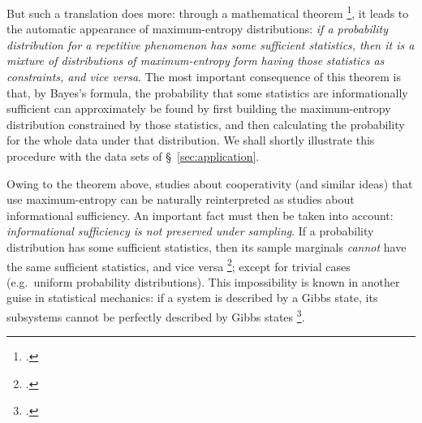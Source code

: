 \documentclass[\ifafour a4paper,12pt,\else a5paper,10pt,\fi%
onecolumn,oneside,article,%
british%
]{memoir}
\theoremstyle{remark}
\theoremstyle{innote}
\newcommand*{\citep}{\footcites}
\renewcommand*{\|}{\nonscript\,\vert\nonscript\;\mathopen{}}
\newcommand*{\sect}{\S}%
\newcommand*{\eg}{{e.g.}}
\begin{document}
But such a translation does more: through a mathematical theorem \citep[and
references therein]{andersen1970}[this theorem was first proved for
continuous probability distributions
by][]{koopman1936,pitman1936,darmois1935}[see][\sect~4.5.3 for further
references]{bernardoetal1994}, it leads to the automatic appearance of
maximum-entropy distributions: \emph{if a probability distribution for a
  repetitive phenomenon has some sufficient statistics, then it is a
  mixture of distributions of maximum-entropy form having those statistics
  as constraints, and vice versa}. 
The most important consequence of this theorem is that, by Bayes's formula,
the probability that some statistics are informationally sufficient can
approximately be found by first building the maximum-entropy distribution
constrained by those statistics, and then calculating the probability for
the whole data under that distribution. We shall shortly illustrate this
procedure with the data sets of \sect~\ref{sec:application}.


\medskip

Owing to the theorem above, studies about cooperativity (and similar ideas)
that use maximum-entropy can be naturally reinterpreted as studies about
informational sufficiency. An important fact must then be taken into
account: \emph{informational sufficiency is not preserved under sampling}.
If a probability distribution has some sufficient statistics, then its
sample marginals \emph{cannot} have the same sufficient statistics, and
vice versa \citep[\sect~3.1]{portamanaetal2015}; except for trivial cases
(\eg\ uniform probability distributions). %
This impossibility is known in another guise in statistical mechanics: if a
system is described by a Gibbs state, its subsystems cannot be perfectly
described by Gibbs states \citep[\eg][and references
therein]{maesetal1999}. %
\end{document}
